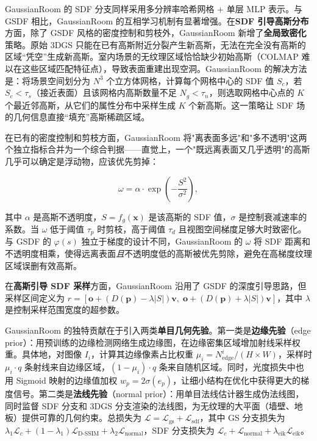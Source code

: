 GaussianRoom 的 SDF 分支同样采用多分辨率哈希网格 + 单层 MLP 表示。与 GSDF 相比，GaussianRoom 的互相学习机制有显著增强。在\textbf{SDF 引导高斯分布}方面，除了 GSDF 风格的密度控制和剪枝外，GaussianRoom 新增了\textbf{全局致密化}策略。原始 3DGS 只能在已有高斯附近分裂产生新高斯，无法在完全没有高斯的区域“凭空”生成新高斯。室内场景的无纹理区域恰恰缺少初始高斯（COLMAP 难以在这些区域匹配特征点），导致表面重建出现空洞。GaussianRoom 的解决方法是：将场景空间划分为 $N^3$ 个立方体网格，计算每个网格中心的 SDF 值 $S_c$，若 $S_c < \tau_s$（接近表面）且该网格内高斯数量不足 $N_g < \tau_n$，则选取网格中心点的 $K$ 个最近邻高斯，从它们的属性分布中采样生成 $K$ 个新高斯。这一策略让 SDF 场的几何信息直接“填充”高斯稀疏区域。

在已有的密度控制和剪枝方面，GaussianRoom 将"离表面多远"和"多不透明"这两个独立指标合并为一个综合判据——直觉上，一个"既远离表面又几乎透明"的高斯几乎可以确定是浮动物，应该优先剪掉：

\begin{equation}
    \omega = \alpha \cdot \exp\!\left(-\frac{S^2}{\sigma^2}\right),
\end{equation}

其中 $\alpha$ 是高斯不透明度，$S = f_g(\mathbf{x})$ 是该高斯的 SDF 值，$\sigma$ 是控制衰减速率的系数。当 $\omega$ 低于阈值 $\tau_p$ 时剪枝，高于阈值 $\tau_d$ 且视图空间梯度足够大时致密化。与 GSDF 的 $\varphi(s)$ 独立于梯度的设计不同，GaussianRoom 的 $\omega$ 将 SDF 距离和不透明度相乘，使得远离表面\emph{且}不透明度低的高斯被优先剪除，避免在高梯度纹理区域误删有效高斯。

在\textbf{高斯引导 SDF 采样}方面，GaussianRoom 沿用了 GSDF 的深度引导思路，但采样区间定义为 $r = [\mathbf{o} + (D(\mathbf{p}) - \lambda|S|)\mathbf{v}, \; \mathbf{o} + (D(\mathbf{p}) + \lambda|S|)\mathbf{v}]$，其中 $\lambda$ 是控制采样范围宽度的超参数。

GaussianRoom 的独特贡献在于引入两类\textbf{单目几何先验}。第一类是\textbf{边缘先验}（edge prior）：用预训练的边缘检测网络生成边缘图，在边缘密集区域增加射线采样权重。具体地，对图像 $I_i$，计算其边缘像素占比权重 $\mu_i = N_{\text{edge}}^i / (H \times W)$，采样时 $\mu_i \cdot q$ 条射线来自边缘区域，$(1-\mu_i) \cdot q$ 条来自随机区域。同时，光度损失中也用 Sigmoid 映射的边缘值加权 $w_p = 2\sigma(e_p)$，让细小结构在优化中获得更大的梯度信号。第二类是\textbf{法线先验}（normal prior）：用单目法线估计器生成伪法线图，同时监督 SDF 分支和 3DGS 分支渲染的法线图，为无纹理的大平面（墙壁、地板）提供可靠的几何约束。总损失为 $\mathcal{L} = \mathcal{L}_{\text{gs}} + \mathcal{L}_{\text{sdf}}$，其中 GS 分支损失为 $\lambda_1 \mathcal{L}_c + (1-\lambda_1)\mathcal{L}_{\text{D-SSIM}} + \lambda_2 \mathcal{L}_{\text{normal}}$，SDF 分支损失为 $\mathcal{L}_c + \mathcal{L}_{\text{normal}} + \lambda_{\text{eik}}\mathcal{L}_{\text{eik}}$。

